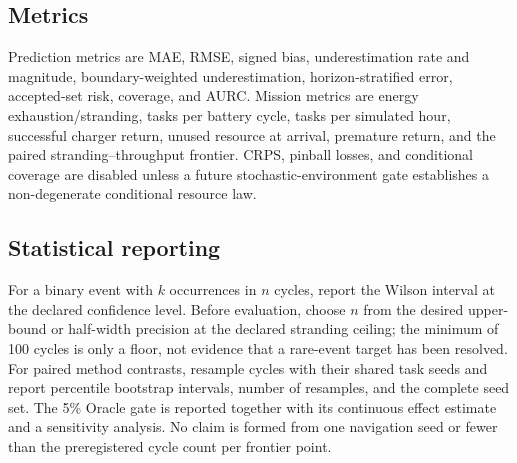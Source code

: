 \subsection{Metrics}

Prediction metrics are MAE, RMSE, signed bias, underestimation rate and magnitude, boundary-weighted underestimation, horizon-stratified error, accepted-set risk, coverage, and AURC. Mission metrics are energy exhaustion/stranding, tasks per battery cycle, tasks per simulated hour, successful charger return, unused resource at arrival, premature return, and the paired stranding--throughput frontier. CRPS, pinball losses, and conditional coverage are disabled unless a future stochastic-environment gate establishes a non-degenerate conditional resource law.

\subsection{Statistical reporting}

For a binary event with \(k\) occurrences in \(n\) cycles, report the Wilson interval at the declared confidence level. Before evaluation, choose \(n\) from the desired upper-bound or half-width precision at the declared stranding ceiling; the minimum of 100 cycles is only a floor, not evidence that a rare-event target has been resolved. For paired method contrasts, resample cycles with their shared task seeds and report percentile bootstrap intervals, number of resamples, and the complete seed set. The 5\% Oracle gate is reported together with its continuous effect estimate and a sensitivity analysis. No claim is formed from one navigation seed or fewer than the preregistered cycle count per frontier point.
